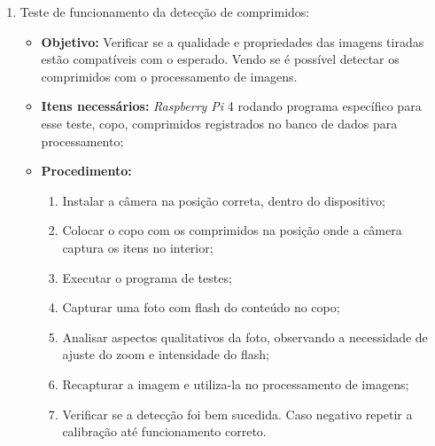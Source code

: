 \begin{enumerate}
    \item Teste de funcionamento da detecção de comprimidos:
    
    \begin{itemize}
        \item \textbf{Objetivo:} Verificar se a qualidade e propriedades das imagens tiradas estão compatíveis com o esperado. Vendo se é possível detectar os comprimidos com o processamento de imagens.
        \item \textbf{Itens necessários:} \textit{Raspberry Pi} 4 rodando programa específico para esse teste, copo, comprimidos registrados no banco de dados para processamento;
        \item \textbf{Procedimento:} 
        \begin{enumerate}
            \item Instalar a câmera na posição correta, dentro do dispositivo;
            \item Colocar o copo com os comprimidos na posição onde a câmera captura os itens no interior;
            \item Executar o programa de testes;
            \item Capturar uma foto com flash do conteúdo no copo;
            \item Analisar aspectos qualitativos da foto, observando a necessidade de ajuste do zoom e intensidade do flash;
            \item Recapturar a imagem e utiliza-la no processamento de imagens;
            \item Verificar se a detecção foi bem sucedida. Caso negativo repetir a calibração até funcionamento correto.
        \end{enumerate}
    \end{itemize}
\end{enumerate}